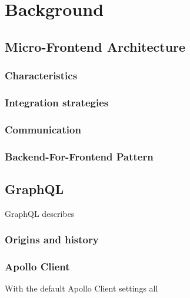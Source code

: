 \chapter{Background}

\section{Micro-Frontend Architecture}

\subsection{Characteristics}

\subsection{Integration strategies}

\subsection{Communication}

\subsection{Backend-For-Frontend Pattern}

\section{GraphQL}

GraphQL describes 

\subsection{Origins and history}

\subsection{Apollo Client}


With the default Apollo Client settings all 